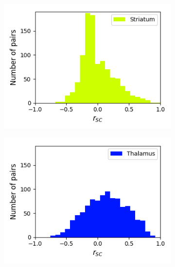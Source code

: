 \documentclass[a4paper,12pt]{article}
\theoremstyle{definition}
\begin{document}
\begin{figure}[p]
\begin{subfigure}{0.5\textwidth}
    \includegraphics[width=\textwidth]{figures/all_striatum_14_1p0_correlation_histogram.png}
  \end{subfigure}
  \begin{subfigure}{0.5\textwidth}
    \centering
    \includegraphics[width=\textwidth]{figures/all_thalamus_15_1p0_correlation_histogram.png}
  \end{subfigure}
  \begin{subfigure}{0.5\textwidth}
    \centering

\end{subfigure}
\end{figure}
\end{document}
